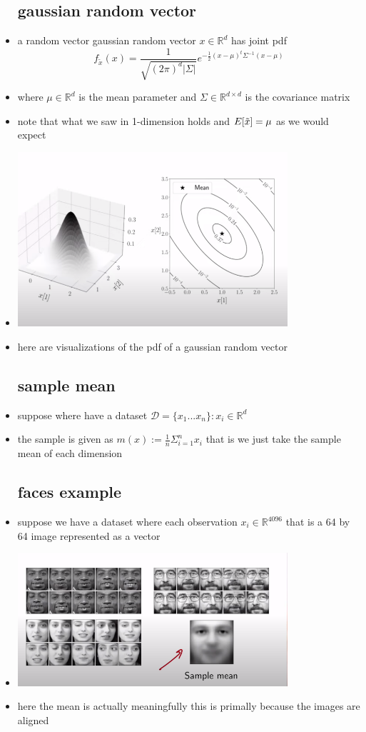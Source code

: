 \documentclass{article}
\begin{document}
\begin{itemize}
\subsection*{gaussian random vector}
\item a random vector gaussian random vector $x\in \mathbb{R}^{d}$ has joint pdf $$f_{\tilde{x}}(x)=\frac{1}{\sqrt{(2\pi)^d|\Sigma
|}}e^{-\frac{1}{2}(x-\mu)^t\Sigma^{-1}(x-\mu)}$$
\item where $\mu\in \mathbb{R}^d$ is the mean parameter and $\Sigma\in \mathbb{R}^{d\times d }$ is the covariance matrix 
\item note that what we saw in 1-dimension holds and $E[\Tilde{x}]=\mu$ as we would expect
\item \includegraphics[width=10cm]{notes/week_8/vedio_1/images/v1_1.png}
\item here are visualizations of the pdf of a gaussian random vector 
\subsection*{sample mean}
\item suppose where have a dataset $\mathcal{D}=\{x_1...x_n\}:x_i\in \mathbb{R}^{d}$
\item the sample is given as $m(x):=\frac{1}{n}\Sigma_{i=1}^{n}x_i$ that is we just take the sample mean of each dimension
\subsection*{faces example}
\item suppose we have a dataset where each observation $x_i\in \mathbb{R}^{4096}$ that is a 64 by 64 image represented as a vector
\item \includegraphics[width=10cm]{notes/week_8/vedio_1/images/v1_2.png}
\item here the mean is actually meaningfully this is primally because the images are aligned

\end{itemize}
\end{document}
